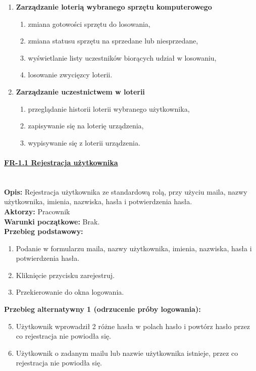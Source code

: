 \begin{enumerate}[label={\textbf{FR}-\bfseries\arabic*}]
		
		\item \textbf{Zarządzanie loterią wybranego sprzętu komputerowego}
		\begin{enumerate}[label={FR-\arabic{enumi}.\arabic*},noparskip]
        \item zmiana gotowości sprzętu do losowania,
        \item zmiana statusu sprzętu na sprzedane lub niesprzedane,
				\item wyświetlanie listy uczestników biorących udział w losowaniu,
        \item losowanie zwycięzcy loterii.
    \end{enumerate}
		
		\item \textbf{Zarządzanie uczestnictwem w loterii}
			\begin{enumerate}[label={FR-\arabic{enumi}.\arabic*},noparskip]
        \item przeglądanie historii loterii wybranego użytkownika,
        \item zapisywanie się na loterię urządzenia,
				\item wypisywanie się z loterii urządzenia.
    \end{enumerate}
\end{enumerate}

\paragraph{\underline{FR-1.1 Rejestracja użytkownika}}\mbox{}\\[1mm]
	\noindent\textbf{Opis:} Rejestracja użytkownika ze standardową rolą, przy użyciu maila, nazwy użytkownika, imienia, nazwiska, hasła i potwierdzenia hasła.\\
	\noindent\textbf{Aktorzy:} Pracownik\\
	\textbf{Warunki początkowe:} Brak.\\
	\textbf{Przebieg podstawowy:}
	\begin{enumerate}[noparskip]
		\item Podanie w formularzu maila, nazwy użytkownika, imienia, nazwiska, hasła i potwierdzenia hasła.
    \item Kliknięcie przycisku zarejestruj.
		\item Przekierowanie do okna logowania.
	\end{enumerate}
	\textbf{Przebieg alternatywny 1 (odrzucenie próby logowania):}
	\begin{enumerate}[noparskip]\setcounter{enumi}{4}
		\item Użytkownik wprowadził 2 różne hasła w polach hasło i powtórz hasło przez co rejestracja nie powiodła się.
		\item Użytkownik o zadanym mailu lub nazwie użytkownika istnieje, przez co rejestracja nie powiodła się.
	\end{enumerate}	\mbox{}\\[-11mm]


